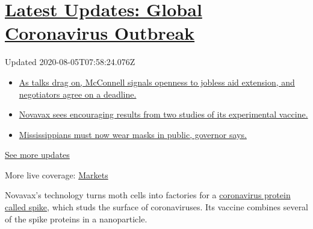 \hypertarget{latest-updates-global-coronavirus-outbreak}{%
\section{\texorpdfstring{\href{https://www.nytimes.com/2020/08/04/world/coronavirus-cases.html?action=click\&pgtype=Article\&state=default\&region=MAIN_CONTENT_1\&context=storylines_live_updates}{Latest
Updates: Global Coronavirus
Outbreak}}{Latest Updates: Global Coronavirus Outbreak}}\label{latest-updates-global-coronavirus-outbreak}}

Updated 2020-08-05T07:58:24.076Z

\begin{itemize}
\tightlist
\item
  \href{https://www.nytimes.com/2020/08/04/world/coronavirus-cases.html?action=click\&pgtype=Article\&state=default\&region=MAIN_CONTENT_1\&context=storylines_live_updates\#link-762df92}{As
  talks drag on, McConnell signals openness to jobless aid extension,
  and negotiators agree on a deadline.}
\item
  \href{https://www.nytimes.com/2020/08/04/world/coronavirus-cases.html?action=click\&pgtype=Article\&state=default\&region=MAIN_CONTENT_1\&context=storylines_live_updates\#link-1228a480}{Novavax
  sees encouraging results from two studies of its experimental
  vaccine.}
\item
  \href{https://www.nytimes.com/2020/08/04/world/coronavirus-cases.html?action=click\&pgtype=Article\&state=default\&region=MAIN_CONTENT_1\&context=storylines_live_updates\#link-794484ed}{Mississippians
  must now wear masks in public, governor says.}
\end{itemize}

\href{https://www.nytimes.com/2020/08/04/world/coronavirus-cases.html?action=click\&pgtype=Article\&state=default\&region=MAIN_CONTENT_1\&context=storylines_live_updates}{See
more updates}

More live coverage:
\href{https://www.nytimes.com/live/2020/08/04/business/stock-market-today-coronavirus?action=click\&pgtype=Article\&state=default\&region=MAIN_CONTENT_1\&context=storylines_live_updates}{Markets}

Novavax's technology turns moth cells into factories for a
\href{https://www.nytimes.com/2020/07/28/health/coronavirus-mutation-spike-treatment.html}{coronavirus
protein called spike}, which studs the surface of coronaviruses. Its
vaccine combines several of the spike proteins in a nanoparticle.

